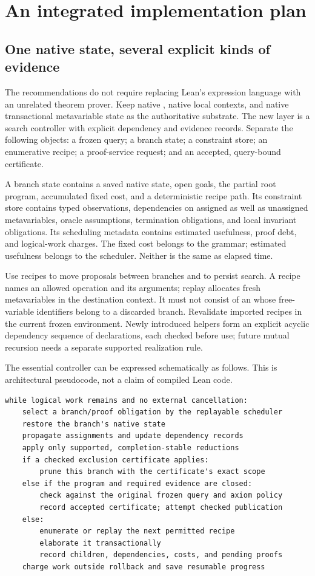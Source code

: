 \section{An integrated implementation plan}\label{sec:roadmap}

\subsection{One native state, several explicit kinds of evidence}

The recommendations do not require replacing Lean's expression language with an unrelated theorem prover. Keep native , native local contexts, and native transactional metavariable state as the authoritative substrate. The new layer is a search controller with explicit dependency and evidence records. Separate the following objects: a frozen query; a branch state; a constraint store; an enumerative recipe; a proof-service request; and an accepted, query-bound certificate.

A branch state contains a saved native state, open goals, the partial root program, accumulated fixed cost, and a deterministic recipe path. Its constraint store contains typed observations, dependencies on assigned as well as unassigned metavariables, oracle assumptions, termination obligations, and local invariant obligations. Its scheduling metadata contains estimated usefulness, proof debt, and logical-work charges. The fixed cost belongs to the grammar; estimated usefulness belongs to the scheduler. Neither is the same as elapsed time.

Use recipes to move proposals between branches and to persist search. A recipe names an allowed operation and its arguments; replay allocates fresh metavariables in the destination context. It must not consist of an  whose free-variable identifiers belong to a discarded branch. Revalidate imported recipes in the current frozen environment. Newly introduced helpers form an explicit acyclic dependency sequence of declarations, each checked before use; future mutual recursion needs a separate supported realization rule.

The essential controller can be expressed schematically as follows. This is architectural pseudocode, not a claim of compiled Lean code.
\begin{lstlisting}
while logical work remains and no external cancellation:
    select a branch/proof obligation by the replayable scheduler
    restore the branch's native state
    propagate assignments and update dependency records
    apply only supported, completion-stable reductions
    if a checked exclusion certificate applies:
        prune this branch with the certificate's exact scope
    else if the program and required evidence are closed:
        check against the original frozen query and axiom policy
        record accepted certificate; attempt checked publication
    else:
        enumerate or replay the next permitted recipe
        elaborate it transactionally
        record children, dependencies, costs, and pending proofs
    charge work outside rollback and save resumable progress
\end{lstlisting}

